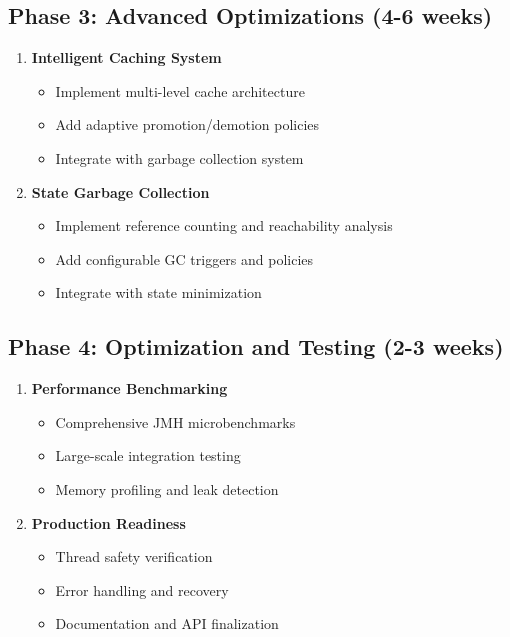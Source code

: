 \documentclass[11pt,a4paper]{article}
\begin{document}
\subsection{Phase 3: Advanced Optimizations (4-6 weeks)}

\begin{enumerate}
    \item \textbf{Intelligent Caching System}
    \begin{itemize}
        \item Implement multi-level cache architecture
        \item Add adaptive promotion/demotion policies
        \item Integrate with garbage collection system
    \end{itemize}
    
    \item \textbf{State Garbage Collection}
    \begin{itemize}
        \item Implement reference counting and reachability analysis
        \item Add configurable GC triggers and policies
        \item Integrate with state minimization
    \end{itemize}
\end{enumerate}

\subsection{Phase 4: Optimization and Testing (2-3 weeks)}

\begin{enumerate}
    \item \textbf{Performance Benchmarking}
    \begin{itemize}
        \item Comprehensive JMH microbenchmarks
        \item Large-scale integration testing
        \item Memory profiling and leak detection
    \end{itemize}
    
    \item \textbf{Production Readiness}
    \begin{itemize}
        \item Thread safety verification
        \item Error handling and recovery
        \item Documentation and API finalization
    \end{itemize}
\end{enumerate}
\end{document}
